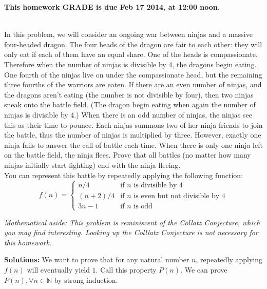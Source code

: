 \documentclass[11pt]{article}
\newif\ifsolutions
\renewcommand{\answer}[1]{{\color{mydarkblue}\textbf{Solutions: }#1}}
\begin{document}
\maketitle

\vspace{0.5em}
{\Large{\textbf{This homework GRADE is due Feb 17 2014, at 12:00 noon.}}}


\begin{qunlist}

 \\ 
In this problem, we will consider an ongoing war between ninjas and a massive four-headed dragon. 
The four heads of the dragon are fair to each other: 
they will only eat if each of them have an equal share. One of the heads is compassionate. 
Therefore when the number of ninjas is divisible by 4, the dragons begin eating.  
One fourth of the ninjas live on under the compassionate head, 
but the remaining three fourths of the warriors are eaten. 
If there are an even number of ninjas, and the dragons aren't eating 
(the number is not divisible by four), then two ninjas sneak onto the battle field. 
(The dragon begin eating when again the number of ninjas is divisible by 4.)
When there is an odd number of ninjas, the ninjas see this as their time to pounce. 
Each ninjas summons two of her ninja friends to join the battle, 
thus the number of ninjas is multiplied by three. 
However, exactly one ninja fails to answer the call of battle each time. 
When there is only one ninja left on the battle field, the ninja flees. 
Prove that all battles (no matter how many ninjas initially start fighting) 
end with the ninja fleeing. \\
You can represent this battle by repeatedly applying the following function:
\[ f(n) = \left\{ 
    \begin{array}{cl} 
        n/4 & \text{if $n$ is divisible by 4} \\
        (n+2)/4 & \text{if $n$ is even but not divisible by 4} \\
        3n - 1 & \text{if $n$ is odd} 
    \end{array} 
\right. \]

\textit{Mathematical aside: This problem is reminiscent of the Collatz Conjecture, which you may find interesting. Looking up the Colllatz Conjecture is not necessary for this homework.}

\ifsolutions
\answer{
We want to prove that for any natural number $n$, repeatedly applying $f(n)$ will eventually yield $1$. 
Call this property $P(n)$. We can prove $P(n), \forall n \in \mathbb{N}$ by strong induction.

}
\end{qunlist}
\end{document}
